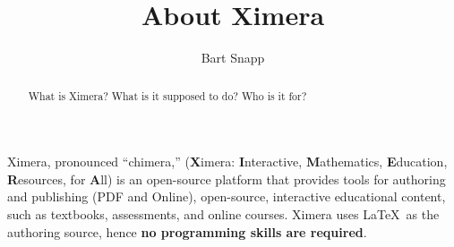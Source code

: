 \documentclass{ximera}
\title{About Ximera}
\author{Bart Snapp}
\begin{document}
\begin{abstract}
    What is Ximera? What is it supposed to do? Who is it for?
\end{abstract}
\maketitle

Ximera, pronounced ``chimera,'' (\textbf{X}imera: \textbf{I}nteractive,
\textbf{M}athematics, \textbf{E}ducation,
\textbf{R}esources, for \textbf{A}ll) is an open-source platform that provides
tools for
authoring and publishing (PDF and Online), open-source, interactive educational
content, such as textbooks, assessments, and online courses. Ximera uses \LaTeX\ as the authoring source,
 hence \textbf{no programming skills are required}.
\end{document}
